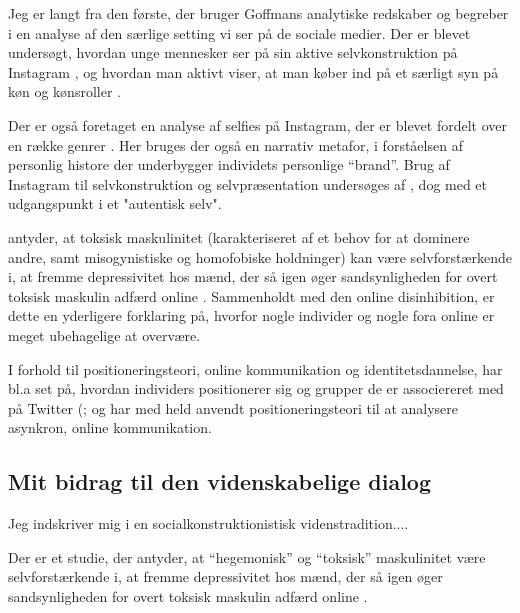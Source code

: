 Jeg er langt fra den første, der bruger Goffmans analytiske 
redskaber og begreber i en analyse af den særlige setting vi ser 
på de sociale medier. Der er blevet undersøgt, hvordan unge 
mennesker ser på sin aktive selvkonstruktion på Instagram 
\autocite{seehaferNOFILTERExplorationInstagram2017a}, og hvordan 
man aktivt viser, at man køber ind på et særligt syn på køn og 
kønsroller \autocite{bakerGoodMorningFitfam2018}. 

Der er også foretaget en analyse af selfies på Instagram, der er 
blevet fordelt over en række genrer 
\autocite{eagarClassifyingNarratedSelfie2016}. Her bruges der også 
en narrativ metafor, i forståelsen af personlig histore der 
underbygger individets personlige “brand”. Brug
af Instagram til selvkonstruktion og selvpræsentation undersøges 
af \citeauthor{lazebnaRoleCommunicationApprehension2015}, dog med 
et udgangspunkt i et "autentisk selv".

\citeauthor{parentSocialMediaBehavior2018} antyder, at toksisk 
maskulinitet (karakteriseret af et behov for at dominere andre, 
samt misogynistiske og homofobiske holdninger) kan være 
selvforstærkende i, at fremme depressivitet hos mænd, der så igen 
øger sandsynligheden for overt toksisk maskulin adfærd online 
\autocite{parentSocialMediaBehavior2018}. Sammenholdt med den 
online disinhibition, er dette en yderligere forklaring på, 
hvorfor nogle individer og nogle fora online er meget ubehagelige 
at overvære.

I forhold til positioneringsteori, online kommunikation og 
identitetsdannelse, har bl.a 
\citeauthor{lopezlongTweetingChoirReligious2012} set på, hvordan 
individers positionerer sig og grupper de er associereret med på 
Twitter (\citeyear{lopezlongTweetingChoirReligious2012}; og 
\citeauthor{dennenFacilitatorPresenceIdentity2011} har med held 
anvendt positioneringsteori til at analysere asynkron, online 
kommunikation.

\subsection{Mit bidrag til den videnskabelige dialog}

Jeg indskriver mig i en socialkonstruktionistisk 
videnstradition....

Der er et studie, der antyder, at “hegemonisk” og “toksisk” 
maskulinitet være selvforstærkende i, at fremme depressivitet hos 
mænd, der så igen øger sandsynligheden for overt toksisk maskulin 
adfærd online \autocite{parentSocialMediaBehavior2018}.

